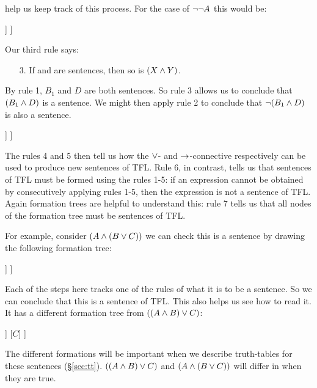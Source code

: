  help us keep track of this process. For the case of $\neg\neg A$ this would be:
\begin{center}
\begin{forest}
	[$\mainconnective{\enot}\enot A$
		[$\mainconnective{\enot}A$
			[$A$]
		]
	]
\end{forest}
\end{center}

Our third rule says:
\begin{enumerate}
\item[3.] If \metaX and \metaY are sentences, then so is $(X\mathbin{\wedge}Y)$.
\end{enumerate}
By rule 1, $B_1$ and $D$ are both sentences. So rule 3 allows us to conclude that $(B_1\mathbin{\wedge} D)$ is a sentence. We might then apply rule 2 to conclude that $\neg(B_1\mathbin{\wedge} D)$ is also a sentence.
\begin{center}
\begin{forest}
	[$\mainconnective{\enot} (B_1 \eand D)$
		[$(B_1\mainconnective{\eand} D)$
			[$B_1$]
			[$D$]
		]
	]
\end{forest}
\end{center}

The rules 4 and 5 then tell us how the $\vee$- and $\rightarrow$-connective respectively can be used to produce new sentences of TFL. Rule 6, in contrast, tells us that sentences of TFL must be formed using the rules 1-5: if an expression cannot be obtained by consecutively applying rules 1-5, then the expression is not a sentence of TFL. Again formation trees are helpful to understand this: rule 7 tells us that all nodes of the formation tree must be sentences of TFL.

For example, consider $(A \mathbin{\wedge} (B \vee C))$ we can check this is a sentence by drawing the following formation tree:
\label{S:formationtree}
\begin{center}
\begin{forest}
	[$(A\mainconnective{\eand} (B\eor C))$
		[$A$]
		[$(B\mainconnective{\eor} C)$
			[$B$]
			[$C$]
		]
	]
\end{forest}
\end{center}
Each of the steps here tracks one of the rules of what it is to be a sentence. So we can conclude that this is a sentence of TFL. This also helps us see how to read it.
It has a different formation tree from $((A\mathbin{\wedge} B)\vee C)$:
\begin{center}
\begin{forest}
	[$((A{\eand} B)\mainconnective{\eor} C))$
		[$(A\mainconnective{\eand} B)$
			[$A$]
			[$B$]
		]
		[$C$]
	]
\end{forest}
\end{center}
The different formations will be important when we describe truth-tables for these sentences (\S\ref{sec:tt}). $((A\mathbin{\wedge} B)\vee C)$ and $(A\mathbin{\wedge} (B\vee C))$ will differ in when they are true.


